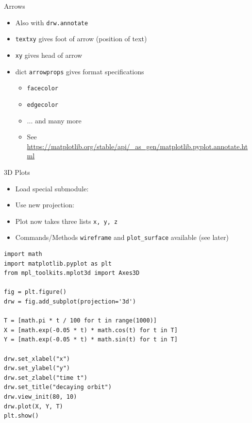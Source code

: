 \begin{frame}{Arrows}
%
\begin{itemize}
\item Also with \texttt{drw.annotate}
\item \texttt{textxy} gives foot of arrow (position of text)
\item \texttt{xy} gives head of arrow
\item dict \texttt{arrowprops} gives format specifications
	\begin{itemize}
	\item \texttt{facecolor}
	\item \texttt{edgecolor}
	\item ... and many more
	\item See \url{https://matplotlib.org/stable/api/_as_gen/matplotlib.pyplot.annotate.html}
	\end{itemize}
\end{itemize}
%
\end{frame}


\begin{frame}{3D Plots}
%
\begin{itemize}
\item Load special submodule:\\
\item Use new projection:\\
\item Plot now takes three lists \texttt{x, y, z}
\item Commands/Methods \texttt{wireframe} and \texttt{plot\_surface} available (see later)
\end{itemize}
%
\end{frame}


\begin{frame}[fragile]
%
\begin{codebox}
\begin{verbatim}
import math
import matplotlib.pyplot as plt
from mpl_toolkits.mplot3d import Axes3D

fig = plt.figure()
drw = fig.add_subplot(projection='3d')

T = [math.pi * t / 100 for t in range(1000)]
X = [math.exp(-0.05 * t) * math.cos(t) for t in T]
Y = [math.exp(-0.05 * t) * math.sin(t) for t in T]

drw.set_xlabel("x")
drw.set_ylabel("y")
drw.set_zlabel("time t")
drw.set_title("decaying orbit")
drw.view_init(80, 10)
drw.plot(X, Y, T)
plt.show()
\end{verbatim}
\end{codebox}
%
\end{frame}

